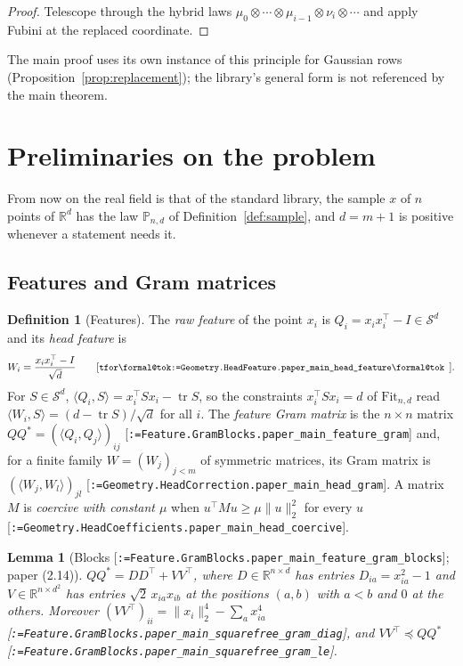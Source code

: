 \documentclass[11pt]{article}
\makeatletter
\newcommand{\formal@break}[1]{\@tfor\formal@tok:=#1\do{%
  \formal@tok
  \expandafter\ifx\formal@tok.\allowbreak\else
  \expandafter\ifx\formal@tok\_\allowbreak\fi\fi}}
\DeclareRobustCommand{\formal}[1]{\textnormal{[\texttt{\small\formal@break{#1}}]}}
\newcommand{\R}{\mathbb{R}}
\newcommand{\Prob}{\mathbb{P}}
\newcommand{\Sym}{\mathcal{S}}
\newcommand{\ip}[2]{\langle #1, #2\rangle}
\newcommand{\norm}[1]{\lVert #1\rVert}
\newcommand{\tr}{\operatorname{tr}}
\newcommand{\sqd}{\sqrt{d}}
\newcommand{\Id}{I}
\newcommand{\Fit}{\mathrm{Fit}}
\theoremstyle{plain}
\newtheorem{lemma}[theorem]{Lemma}
\theoremstyle{definition}
\newtheorem{definition}[theorem]{Definition}
\makeatother
\begin{document}
\begin{proof}
Telescope through the hybrid laws $\mu_0 \otimes\cdots\otimes\mu_{i-1}\otimes\nu_i\otimes\cdots$
and apply Fubini at the replaced coordinate.
\end{proof}

The main proof uses its own instance of this principle for Gaussian rows
(Proposition~\ref{prop:replacement}); the library's general form is not
referenced by the main theorem.

\section{Preliminaries on the problem}\label{sec:prelim}

From now on the real field is that of the standard library, the sample
$x$ of $n$ points of $\R^d$ has the law $\Prob_{n,d}$ of
Definition~\ref{def:sample}, and $d = m + 1$ is positive whenever a
statement needs it.

\subsection{Features and Gram matrices}\label{sec:features}

\begin{definition}[Features]
The \emph{raw feature} of the point $x_i$ is $Q_i = x_i x_i^{\top} - \Id \in \Sym^d$
and its \emph{head feature} is
\[
W_i = \frac{x_i x_i^{\top} - \Id}{\sqd}
\tag*{\formal{Geometry.HeadFeature.paper\_main\_head\_feature}.}
\]
For $S \in \Sym^d$, $\ip{Q_i}{S} = x_i^{\top} S x_i - \tr S$, so the
constraints $x_i^{\top} S x_i = d$ of $\Fit_{n,d}$ read $\ip{W_i}{S} = (d - \tr S)/\sqd$
for all $i$. The \emph{feature Gram matrix} is the $n\times n$ matrix
$Q Q^{*} = (\ip{Q_i}{Q_j})_{ij}$ \formal{Feature.GramBlocks.paper\_main\_feature\_gram}
and, for a finite family $W = (W_j)_{j < m}$ of symmetric matrices, its
Gram matrix is $(\ip{W_j}{W_l})_{jl}$
\formal{Geometry.HeadCorrection.paper\_main\_head\_gram}. A matrix $M$ is
\emph{coercive with constant $\mu$} when $u^{\top} M u \ge \mu \norm{u}_2^2$
for every $u$ \formal{Geometry.HeadCoefficients.paper\_main\_head\_coercive}.
\end{definition}

\begin{lemma}[Blocks \formal{Feature.GramBlocks.paper\_main\_feature\_gram\_blocks}; paper (2.14)]\label{lem:blocks}
$Q Q^{*} = D D^{\top} + V V^{\top}$, where $D \in \R^{n\times d}$ has entries
$D_{ia} = x_{ia}^2 - 1$ and $V \in \R^{n \times d^2}$ has entries
$\sqrt 2\, x_{ia} x_{ib}$ at the positions $(a, b)$ with $a < b$ and $0$ at the
others. Moreover $(V V^{\top})_{ii} = \norm{x_i}_2^4 - \sum_a x_{ia}^4$
\formal{Feature.GramBlocks.paper\_main\_squarefree\_gram\_diag}, and
$V V^{\top} \preceq Q Q^{*}$ \formal{Feature.GramBlocks.paper\_main\_squarefree\_gram\_le}.
\end{lemma}
\end{document}
